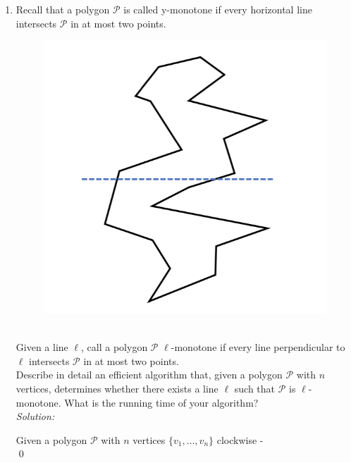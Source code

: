 \documentclass[a4paper, 8pt, oneside]{article}
\newenvironment{sol}
    {\emph{Solution:}
    }
    {
    \qed
    }
\begin{document}
\begin{enumerate}
\item \label{item:q2}  Recall that a polygon $\mathcal{P}$ is called y-monotone if every horizontal line  intersects $\mathcal{P}$ in at most two points. \\
\begin{figure}[h]
\includegraphics[scale=0.5]{example2}
\centering
\end{figure} \\
Given a line $\ell$, call a polygon $\mathcal{P}$ $\ell$-monotone if every line perpendicular to $\ell$ intersects $\mathcal{P}$ in at most two points. \\ 

Describe in detail an efficient algorithm that, given a polygon $\mathcal{P}$ with $n$ vertices, determines whether there exists a line $\ell$ such that $\mathcal{P}$ is $\ell$-monotone. What is the running time of your algorithm?\\

\begin{sol}
Given a polygon $\mathcal{P}$ with $n$ vertices $\{v_1, \ldots, v_n \}$ clockwise - \\


\end{sol}
\end{enumerate}
\end{document}
